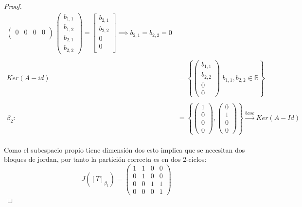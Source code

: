 \documentclass[11pt]{article}
\newcommand{\R}{\mathbb{R}}
\begin{document}
\begin{proof}
\begin{align*}
\begin{pmatrix}
            0&0&0&0\\
        \end{pmatrix}\,\begin{pmatrix}
            b_{1,1}\\
            b_{1,2}\\
            b_{2,1}\\
            b_{2,2}
        \end{pmatrix}=\begin{bmatrix}
            b_{2,1}\\
            b_{2,2}\\
            0\\
            0\\
        \end{bmatrix}\implies b_{2,1}=b_{2,2}=0\\
        \,\\
        Ker(A-id)&=\left\{\begin{pmatrix}
        b_{1,1}\\
        b_{2,2}\\
        0\\
        0
        \end{pmatrix}\,\,b_{1,1},b_{2,2}\in \R\right\}\\
        \,\\
        \beta_2:&=\left\{\begin{pmatrix}
        1\\
        0\\
        0\\
        0
        \end{pmatrix},\begin{pmatrix}
        0\\
        1\\
        0\\
        0
        \end{pmatrix}\right\}\xrightarrow{base}Ker(A-Id)
    \end{align*}\,\\
    Como el subespacio propio tiene dimensi\'on dos esto implica que se necesitan dos bloques de jordan, por tanto la partici\'on correcta es en 
    dos $2$-ciclos:\,\\
    \begin{equation*}
        J([T]_{\beta_1})=\begin{pmatrix}
            1&1&0&0\\
            0&1&0&0\\
            0&0&1&1\\
            0&0&0&1
        \end{pmatrix}
    \end{equation*}
\end{proof}
\end{document}
